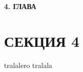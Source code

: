\newpage
\begin{center}
  \textbf{\large 4. ГЛАВА}
\end{center}


\section{СЕКЦИЯ 4}
tralalero tralala
